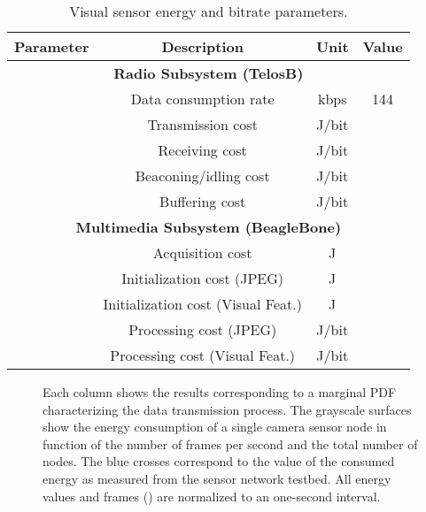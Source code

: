 \documentclass[twocolumn,english]{IEEEtran}
\providecommand{\tabularnewline}{\\}
\theoremstyle{plain}
\theoremstyle{definition}
\begin{document}
\begin{table}[t!]
\begin{centering}
\caption{Visual sensor energy and bitrate parameters.\label{tab:TelosB Settings}}

\par\end{centering}

\centering{}\begin{tabular}{|c|c|c|c|}
\hline 
\textbf{Parameter}  & \textbf{Description}  & \textbf{Unit}  & \textbf{Value }\tabularnewline
\hline 
\hline 
\multicolumn{4}{|c|}{\textbf{Radio Subsystem (TelosB)}}\tabularnewline
\hline 
\hline 
  & Data consumption rate  & kbps  & 144\tabularnewline
\hline 
  & Transmission cost  & J/bit  & \tabularnewline
\hline 
  & Receiving cost  & J/bit  & \tabularnewline
\hline 
  & Beaconing/idling cost  & J/bit  & \tabularnewline
\hline 
  & Buffering cost  & J/bit  & \tabularnewline
\hline 
\hline 
\multicolumn{4}{|c|}{\textbf{Multimedia Subsystem (BeagleBone)}}\tabularnewline
\hline 
\hline 
  &  Acquisition cost  & J  & \tabularnewline
\hline 
  & Initialization cost (JPEG)  & J  & \tabularnewline
\hline 
  & Initialization cost (Visual Feat.) & J & \tabularnewline
\hline 
  & Processing cost (JPEG)  & J/bit  & \tabularnewline
\hline 
  & Processing cost (Visual Feat.)  & J/bit  & \tabularnewline
\hline 
\end{tabular}
\end{table}


\begin{figure*}[t]
\centering {}       

\caption{Each column shows the results corresponding to a marginal PDF characterizing
the data transmission process. The grayscale surfaces show the energy
consumption of a single camera sensor node in function of the number
of frames per second and the total number of nodes. The blue crosses
correspond to the value of the consumed energy as measured from the
sensor network testbed. All energy values and frames () are normalized
to an one-second interval. }


\label{fig:dist_all} 
\end{figure*}
\end{document}
